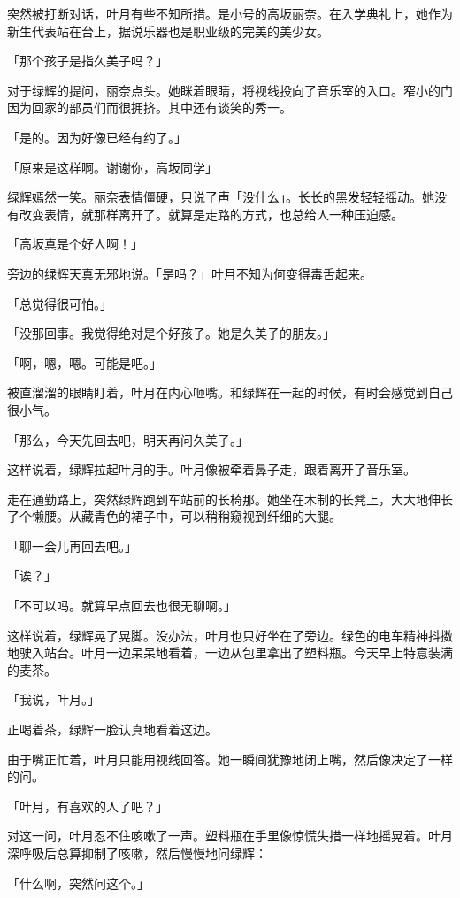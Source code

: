 \documentclass[UTF8]{ctexart}
\begin{document}
    突然被打断对话，叶月有些不知所措。是小号的高坂丽奈。在入学典礼上，她作为新生代表站在台上，据说乐器也是职业级的完美的美少女。

    「那个孩子是指久美子吗？」

    对于绿辉的提问，丽奈点头。她眯着眼睛，将视线投向了音乐室的入口。窄小的门因为回家的部员们而很拥挤。其中还有谈笑的秀一。

    「是的。因为好像已经有约了。」

    「原来是这样啊。谢谢你，高坂同学」

    绿辉嫣然一笑。丽奈表情僵硬，只说了声「没什么」。长长的黑发轻轻摇动。她没有改变表情，就那样离开了。就算是走路的方式，也总给人一种压迫感。

    「高坂真是个好人啊！」

    旁边的绿辉天真无邪地说。「是吗？」叶月不知为何变得毒舌起来。

    「总觉得很可怕。」

    「没那回事。我觉得绝对是个好孩子。她是久美子的朋友。」

    「啊，嗯，嗯。可能是吧。」

    被直溜溜的眼睛盯着，叶月在内心咂嘴。和绿辉在一起的时候，有时会感觉到自己很小气。

    「那么，今天先回去吧，明天再问久美子。」

    这样说着，绿辉拉起叶月的手。叶月像被牵着鼻子走，跟着离开了音乐室。

    走在通勤路上，突然绿辉跑到车站前的长椅那。她坐在木制的长凳上，大大地伸长了个懒腰。从藏青色的裙子中，可以稍稍窥视到纤细的大腿。

    「聊一会儿再回去吧。」

    「诶？」

    「不可以吗。就算早点回去也很无聊啊。」

    这样说着，绿辉晃了晃脚。没办法，叶月也只好坐在了旁边。绿色的电车精神抖擞地驶入站台。叶月一边呆呆地看着，一边从包里拿出了塑料瓶。今天早上特意装满的麦茶。

    「我说，叶月。」

    正喝着茶，绿辉一脸认真地看着这边。

    由于嘴正忙着，叶月只能用视线回答。她一瞬间犹豫地闭上嘴，然后像决定了一样的问。

    「叶月，有喜欢的人了吧？」

    对这一问，叶月忍不住咳嗽了一声。塑料瓶在手里像惊慌失措一样地摇晃着。叶月深呼吸后总算抑制了咳嗽，然后慢慢地问绿辉：

    「什么啊，突然问这个。」
\end{document}

